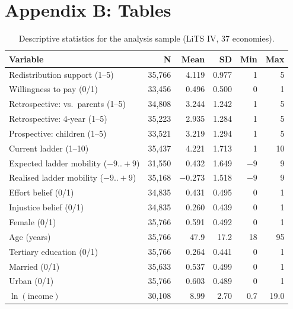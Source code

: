 \documentclass[11pt,a4paper]{article}
\begin{document}
\clearpage
\section*{Appendix B: Tables}

\begin{table}[!ht]
\small
\centering
\caption{Descriptive statistics for the analysis sample (LiTS IV, 37 economies).}
\label{tab:desc}
\begin{tabular}{lrrrrr}
\toprule
Variable & N & Mean & SD & Min & Max \\
\midrule
Redistribution support (1--5) & 35{,}766 & 4.119 & 0.977 & 1 & 5 \\
Willingness to pay (0/1)      & 33{,}456 & 0.496 & 0.500 & 0 & 1 \\
Retrospective: vs.\ parents (1--5)   & 34{,}808 & 3.244 & 1.242 & 1 & 5 \\
Retrospective: 4-year (1--5)         & 35{,}223 & 2.935 & 1.284 & 1 & 5 \\
Prospective: children (1--5)         & 33{,}521 & 3.219 & 1.294 & 1 & 5 \\
Current ladder (1--10)               & 35{,}437 & 4.221 & 1.713 & 1 & 10 \\
Expected ladder mobility ($-9..+9$)  & 31{,}550 & 0.432 & 1.649 & $-9$ & 9 \\
Realised ladder mobility ($-9..+9$)  & 35{,}168 & $-0.273$ & 1.518 & $-9$ & 9 \\
Effort belief (0/1)                  & 34{,}835 & 0.431 & 0.495 & 0 & 1 \\
Injustice belief (0/1)               & 34{,}835 & 0.260 & 0.439 & 0 & 1 \\
Female (0/1)                         & 35{,}766 & 0.591 & 0.492 & 0 & 1 \\
Age (years)                          & 35{,}766 & 47.9  & 17.2  & 18 & 95 \\
Tertiary education (0/1)             & 35{,}766 & 0.264 & 0.441 & 0 & 1 \\
Married (0/1)                        & 35{,}633 & 0.537 & 0.499 & 0 & 1 \\
Urban (0/1)                          & 35{,}766 & 0.603 & 0.489 & 0 & 1 \\
$\ln(\text{income})$                 & 30{,}108 & 8.99  & 2.70  & 0.7 & 19.0 \\
\bottomrule
\end{tabular}
\end{table}
\end{document}
